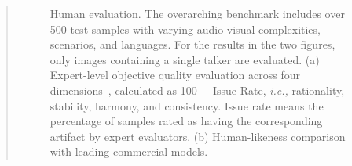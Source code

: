 \begin{abstract}
\begin{figure}[htbp]
  \caption{Human evaluation. The overarching benchmark includes over 500 test samples with varying audio-visual complexities, scenarios, and languages. For the results in the two figures, only images containing a single talker are evaluated. (a) Expert-level objective quality evaluation across four dimensions~\cite{zhou2025evaltalker}, calculated as 100 $-$ Issue Rate, \textit{i.e.,} rationality, stability, harmony, and consistency. Issue rate means the percentage of samples rated as having the corresponding artifact by expert evaluators. (b) Human-likeness comparison with leading commercial models.}
  \label{fig:comp}
  
\end{figure}

    
\end{abstract}


